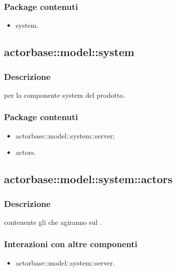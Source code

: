 \documentclass{scalatekids-article}
\begin{document}
\subsubsection{Package contenuti}

\begin{itemize}
\item system.
\end{itemize}

\subsection{actorbase::model::system}
\label{sec:actorbase::model::system}

\subsubsection{Descrizione}

 per la componente system del prodotto.

\subsubsection{Package contenuti}

\begin{itemize}
\item actorbase::model::system::server;
\item actors.
\end{itemize}

\subsection{actorbase::model::system::actors}

\subsubsection{Descrizione}

 contenente gli  che agiranno sul .

\subsubsection{Interazioni con altre componenti}

\begin{itemize}
\item actorbase::model::system::server.
\end{itemize}
\end{document}
